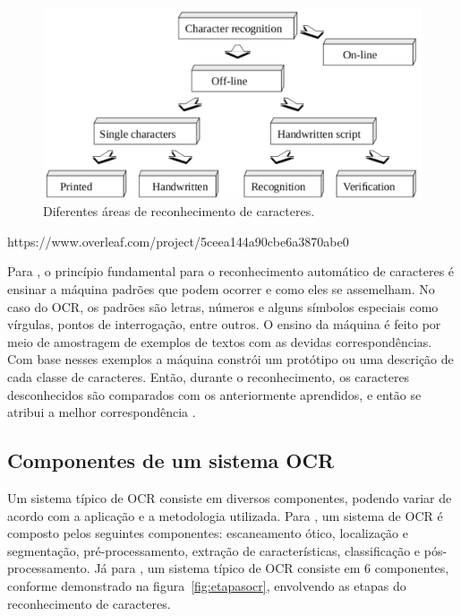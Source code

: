  \begin{figure}[h]
	\centering
	\includegraphics[width=1.0\textwidth]{Imagens/areasocr} 
	\caption[Diferentes áreas de reconhecimento de caracteres.]{Diferentes áreas de reconhecimento de caracteres.}
	\label{fig:areaocr}
\end{figure}https://www.overleaf.com/project/5ceea144a90cbe6a3870abe0

Para , o princípio fundamental para o reconhecimento
automático de caracteres é ensinar a máquina padrões que podem ocorrer e como eles se assemelham. No caso do OCR, os padrões são letras, números e alguns símbolos especiais como vírgulas, pontos de interrogação, entre outros. O ensino da máquina é feito por meio de amostragem de exemplos de textos com as devidas correspondências.
Com base nesses exemplos a máquina constrói um protótipo ou uma
descrição de cada classe de caracteres. Então, durante o reconhecimento, os caracteres desconhecidos são comparados com os anteriormente aprendidos, e então se atribui a melhor correspondência \cite{Eikvil1993}.


\subsection{Componentes de um sistema OCR}
Um sistema típico de OCR consiste em diversos componentes, podendo variar de
acordo com a aplicação e a metodologia utilizada. 
Para , um sistema de OCR é composto pelos seguintes componentes: escaneamento ótico, localização e segmentação, pré-processamento, extração de características, classificação e pós-processamento. Já para , um sistema típico de OCR consiste em 6 componentes, conforme demonstrado na figura~\ref{fig:etapasocr}, envolvendo as etapas do reconhecimento de caracteres.



